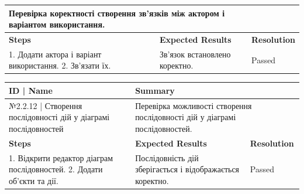 \documentclass[oneside,14pt]{extarticle}
\begin{document}
\begin{normalsize}
\begin{longtable}{|p{7cm}|p{3.5cm}|p{3.5cm}|}
		\multicolumn{2}{|p{7cm}|}{Перевірка коректності створення зв’язків між актором
			і варіантом використання.}
		\\ \hline \textbf{Steps} & \textbf{Expected Results} & \textbf{Resolution} \\ \hline1. Додати актора і варіант використання. 2. Зв’язати їх. & Зв’язок
		встановлено коректно. & Passed \\ \hline \end{longtable}
		\begin{longtable}{|p{7cm}|p{3.5cm}|p{3.5cm}|} 
		\hline \textbf{ID | Name} &\multicolumn{2}{|p{7cm}|}{\textbf{Summary}} 
		\\\hline №2.2.12 | Створення послідовності дій
		у діаграмі послідовностей & \multicolumn{2}{|p{7cm}|}{Перевірка можливості
			створення послідовності дій у діаграмі послідовностей.} \\ \hline \textbf{Steps} & \textbf{Expected Results} & \textbf{Resolution} \\ \hline1. Відкрити редактор
		діаграм послідовностей. 2. Додати об’єкти та дії. & Послідовність дій зберігається
		і відображається коректно. & Passed \\ \hline
	\end{longtable}
	
\end{normalsize}
\end{document}
